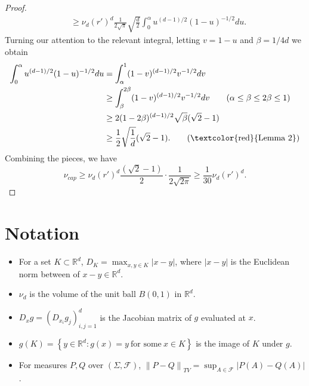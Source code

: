\documentclass{article}
\newcommand{\Reals}{\mathbb{R}}
\newcommand{\norm}[1]{\left\lVert#1\right\rVert}
\newcommand{\abs}[1]{\left \lvert #1 \right \rvert}
\newcommand{\set}[1]{\left\{#1\right\}}
\newcommand{\Rd}{\Reals^d}
\newcommand{\1}{\mathbf{1}}
\theoremstyle{alden}
\theoremstyle{aldenthm}
\theoremstyle{remark}
\begin{document}
\begin{proof}
\begin{align*}
	& \geq \nu_d (r')^d \frac{1}{2 \sqrt{\pi} } \sqrt{\frac{d}{2}} \int_{0}^{\alpha} u^{(d - 1)/2} (1 - u)^{-1/2} du.\tag{Gautschi's inequality}
	\end{align*}
	Turning our attention to the relevant integral, letting $v = 1 - u$ and $\beta = 1/4d$ we obtain
	\begin{align*}
	\int_{0}^{\alpha} u^{(d - 1)/2} (1 - u)^{-1/2} du & = \int_{\alpha}^{1 } (1 - v)^{(d - 1)/2} v^{-1/2} dv \\
	& \geq \int_{\beta}^{2 \beta} (1 - v)^{(d - 1)/2} v^{-1/2} dv \tag{$\alpha \leq \beta \leq 2\beta \leq 1$} \\
	& \geq 2 (1 - 2 \beta)^{(d - 1)/2} \sqrt{\beta} (\sqrt{2} - 1) \\
	& \geq \frac{1}{2}\sqrt{\frac{1}{d}} (\sqrt{2} - 1). \tag{\textcolor{red}{Lemma 2}}
	\end{align*}
	Combining the pieces, we have
	\begin{equation*}
	\nu_{cap} \geq \nu_d (r')^d \frac{(\sqrt{2} - 1)}{2} \cdot \frac{1}{2 \sqrt{2 \pi}} \geq \frac{1}{30} \nu_d (r')^d.
	\end{equation*}
	
\end{proof}

\section{Notation}
\begin{itemize}
	\item For a set $K \subset \Rd$, $D_K = \max_{x,y \in K} \abs{x - y}$, where $\abs{x - y}$ is the Euclidean norm between of $x - y \in \Rd$. 
	\item $\nu_d$ is the volume of the unit ball $B(0,1)$ in $\Rd$. 
	\item $D_x g = (D_{x_i} {g_j})_{i,j = 1}^{d}$ is the Jacobian matrix of $g$ evaluated at $x$.
	\item $g(K) = \set{y \in \Rd: g(x) = y ~\text{for some}~ x \in K}$ is the image of $K$ under $g$.
	\item For measures $P,Q$ over $(\Sigma, \mathcal{F})$, $\norm{P - Q}_{TV} = \sup_{A \in \mathcal{F}} \abs{P(A) - Q(A)}$.  
\end{itemize}
\end{document}
